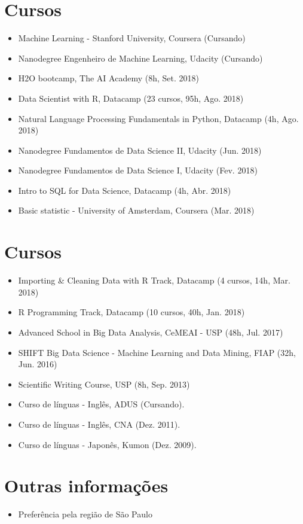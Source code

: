 \documentclass[letterpaper]{twentysecondcv} %
\begin{document}
\section{Cursos}
\begin{itemize}
	\item Machine Learning - Stanford University, Coursera (Cursando)
	\item Nanodegree Engenheiro de Machine Learning, Udacity (Cursando)
	\item H2O bootcamp, The AI Academy (8h, Set. 2018)
	\item Data Scientist with R, Datacamp (23 cursos, 95h, Ago. 2018)
	\item Natural Language Processing Fundamentals in Python, Datacamp (4h, Ago. 2018)
	\item Nanodegree Fundamentos de Data Science II, Udacity (Jun. 2018)
	\item Nanodegree Fundamentos de Data Science I, Udacity (Fev. 2018)
	\item Intro to SQL for Data Science, Datacamp (4h, Abr. 2018)
	\item Basic statistic - University of Amsterdam, Coursera (Mar. 2018)
\end{itemize}

\newpage

\hfill

\section{Cursos}
\begin{itemize}
	\item Importing \& Cleaning Data with R Track, Datacamp (4 cursos, 14h, Mar. 2018)
	\item R Programming Track, Datacamp (10 cursos, 40h, Jan. 2018)
	\item Advanced School in Big Data Analysis, CeMEAI - USP (48h, Jul. 2017)
	\item SHIFT Big Data Science - Machine Learning and Data Mining, FIAP (32h, Jun. 2016)
	\item Scientific Writing Course, USP (8h, Sep. 2013)
	\item Curso de línguas - Inglês, ADUS (Cursando).
	\item Curso de línguas - Inglês, CNA (Dez. 2011).
	\item Curso de línguas - Japonês, Kumon (Dez. 2009).
\end{itemize}

\section{Outras informações}
\begin{itemize}
	\item Preferência pela região de São Paulo
\end{itemize}
\end{document}
